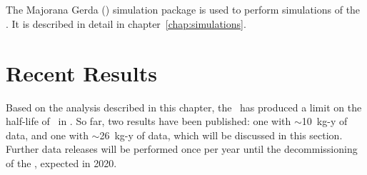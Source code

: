 \documentclass[/main.tex]{subfiles}
\begin{document}
\subsection{\Mage}
The Majorana Gerda (\Mage) simulation package is used to perform simulations of the \MJD\cite{mage2011}.
It is described in detail in chapter~\ref{chap:simulations}.
\\
\section{Recent Results}
Based on the analysis described in this chapter, the \MJD\ has produced a limit on the half-life of \znbb\ in .
So far, two results have been published: one with $\sim$10~kg-y of data\cite{mjd2018}, and one with $\sim$26~kg-y of data\cite{mjd2019}, which will be discussed in this section.
Further data releases will be performed once per year until the decommissioning of the \MJD, expected in 2020.
\\
\end{document}
